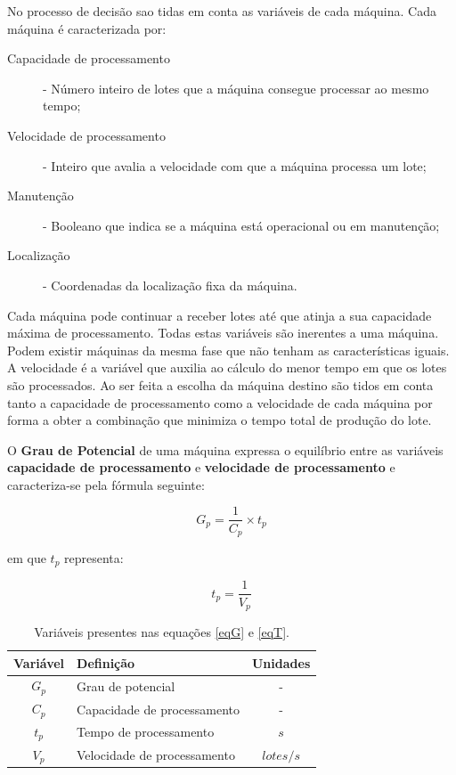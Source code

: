 \begin{titlepage}
No processo de decisão sao tidas em conta as variáveis de cada máquina. Cada máquina é caracterizada por:
\newpage
\begin{description}
\item[Capacidade de processamento] -  Número inteiro de lotes que a máquina consegue processar ao mesmo tempo;
\item[Velocidade de processamento] - Inteiro que avalia a velocidade com que a máquina processa um lote;
\item[Manutenção] - Booleano que indica se a máquina está operacional ou em manutenção;
\item[Localização] - Coordenadas da localização fixa da máquina.
\end{description}

Cada máquina pode continuar a receber lotes até que atinja a sua capacidade máxima de processamento. Todas estas variáveis são inerentes a uma máquina. Podem existir máquinas da mesma fase que não tenham as características iguais. A velocidade é a variável que auxilia ao cálculo do menor tempo em que os lotes são processados. Ao ser feita a escolha da máquina destino são tidos em conta tanto a capacidade de processamento como a velocidade de cada máquina por forma a obter a combinação que minimiza o tempo total de produção do lote.


O \textbf{Grau de Potencial} de uma máquina expressa o equilíbrio entre as variáveis \textbf{capacidade de processamento} e \textbf{velocidade de processamento} e caracteriza-se pela fórmula seguinte:

\begin{equation}
G_{p}=\frac{1}{C_{p}}\times t_{p}
\label{eqG}
\end{equation}

em que $t_{p}$ representa: 

\begin{equation}
t_{p}=\frac{1}{V_{p}}
\label{eqT}
\end{equation}

\begin{table}[H]
\centering
\caption{Variáveis presentes nas equações \ref{eqG} e \ref{eqT}.}
\label{my-label}
\begin{tabular}{@{}p{2cm}ll@{}}
\toprule
\multicolumn{1}{c}{\textbf{Variável}} & \textbf{Definição}   & \multicolumn{1}{c}{\textbf{Unidades}} \\ \midrule
\multicolumn{1}{c}{$G_{p}$} & Grau de potencial &  \multicolumn{1}{c}{-}  \\ \midrule
\multicolumn{1}{c}{$C_{p}$} & Capacidade de processamento &  \multicolumn{1}{c}{-}  \\ \midrule
\multicolumn{1}{c}{$t_{p}$} & Tempo de processamento      & \multicolumn{1}{c}{$s$} \\ \midrule
\multicolumn{1}{c}{$V_{p}$} & Velocidade de processamento  & \multicolumn{1}{c}{$lotes/s$} \\ \bottomrule
\end{tabular}
\end{table}


\end{titlepage}
